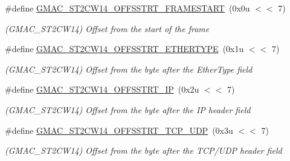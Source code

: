 \begin{DoxyCompactItemize}
\item 
\mbox{\label{group__SAME70__GMAC_gaf93740a9905750a5f28eb0e63c7f4872}} 
\#define \mbox{\hyperlink{group__SAME70__GMAC_gaf93740a9905750a5f28eb0e63c7f4872}{G\+M\+A\+C\+\_\+\+S\+T2\+C\+W14\+\_\+\+O\+F\+F\+S\+S\+T\+R\+T\+\_\+\+F\+R\+A\+M\+E\+S\+T\+A\+RT}}~(0x0u $<$$<$ 7)
\begin{DoxyCompactList}\small\item\em (G\+M\+A\+C\+\_\+\+S\+T2\+C\+W14) Offset from the start of the frame \end{DoxyCompactList}\item 
\mbox{\label{group__SAME70__GMAC_gae7cff136a4c85bcc700c64853d16a14b}} 
\#define \mbox{\hyperlink{group__SAME70__GMAC_gae7cff136a4c85bcc700c64853d16a14b}{G\+M\+A\+C\+\_\+\+S\+T2\+C\+W14\+\_\+\+O\+F\+F\+S\+S\+T\+R\+T\+\_\+\+E\+T\+H\+E\+R\+T\+Y\+PE}}~(0x1u $<$$<$ 7)
\begin{DoxyCompactList}\small\item\em (G\+M\+A\+C\+\_\+\+S\+T2\+C\+W14) Offset from the byte after the Ether\+Type field \end{DoxyCompactList}\item 
\mbox{\label{group__SAME70__GMAC_ga25bb9224c8e022802cb49d71e9407387}} 
\#define \mbox{\hyperlink{group__SAME70__GMAC_ga25bb9224c8e022802cb49d71e9407387}{G\+M\+A\+C\+\_\+\+S\+T2\+C\+W14\+\_\+\+O\+F\+F\+S\+S\+T\+R\+T\+\_\+\+IP}}~(0x2u $<$$<$ 7)
\begin{DoxyCompactList}\small\item\em (G\+M\+A\+C\+\_\+\+S\+T2\+C\+W14) Offset from the byte after the IP header field \end{DoxyCompactList}\item 
\mbox{\label{group__SAME70__GMAC_ga3e046597747ef937c5a082742bf057b3}} 
\#define \mbox{\hyperlink{group__SAME70__GMAC_ga3e046597747ef937c5a082742bf057b3}{G\+M\+A\+C\+\_\+\+S\+T2\+C\+W14\+\_\+\+O\+F\+F\+S\+S\+T\+R\+T\+\_\+\+T\+C\+P\+\_\+\+U\+DP}}~(0x3u $<$$<$ 7)
\begin{DoxyCompactList}\small\item\em (G\+M\+A\+C\+\_\+\+S\+T2\+C\+W14) Offset from the byte after the T\+C\+P/\+U\+DP header field \end{DoxyCompactList}\item 
\mbox{\label{group__SAME70__GMAC_gae8d7e5d5ffce51a8020520674b4d5917}} 

\end{DoxyCompactItemize}
